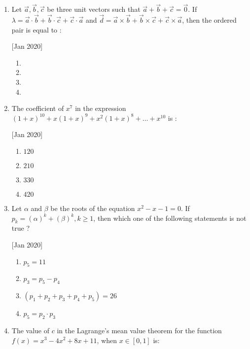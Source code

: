 \documentclass[journal,12pt,twocolumn]{IEEEtran}
\theoremstyle{remark}
\begin{document}
\begin{enumerate}
    \item Let $\vec{a},\vec{b},\vec{c}$ be three unit vectors such that $\vec{a}+\vec{b}+\vec{c}=\vec{0}$. If $\lambda=\vec{a}\cdot\vec{b}+\vec{b}\cdot\vec{c}+\vec{c}\cdot\vec{a}$ and $\vec{d}=\vec{a}\times\vec{b}+\vec{b}\times\vec{c}+\vec{c}\times\vec{a}$, then the ordered pair  is equal to :
    
    \hfill[Jan 2020]
        \begin{enumerate}
            \item {}
            \item {}
            \item {}
            \item {}
        \end{enumerate}

    \item The coefficient of $x^7$ in the expression $(1 + x)^{10} + x(1 + x)^9 + x^2(1 + x)^8 +\dots+x^{10}$ is :
    
    \hfill[Jan 2020]
        \begin{enumerate}
            \item $120$
            \item $210$
            \item $330$
            \item $420$
        \end{enumerate}

    \item Let $\alpha$ and $\beta$ be the roots of the equation $x^2-x-1=0$. If $p_k=(\alpha)^k+(\beta)^k,k\geq1$, then which one of the following statements is not true ?
    
    \hfill[Jan 2020]
        \begin{enumerate}
            \item $p_5=11$
            \item $p_3=p_5-p_4$
            \item $(p_1+p_2+p_3+p_4+p_5)=26$
            \item $p_5=p_2\cdot p_3$
        \end{enumerate}

    \item The value of $c$ in the Lagrange's mean value theorem for the function $f(x)=x^3-4x^2+8x+11$, when $x\in[0,1]$ is:
    

\end{enumerate}
\end{document}
